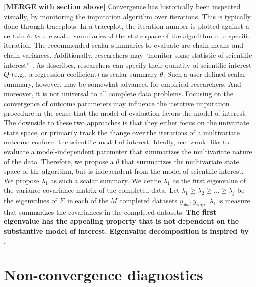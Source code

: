 \documentclass[Royal,times,sageh]{sagej}
\begin{document}
\textbf{{[}MERGE with section above{]}} Convergence has historically been inspected visually, by monitoring the imputation algorithm over iterations. This is typically done through traceplots. In a traceplot, the iteration number is plotted against a certain \(\theta\). \(\theta\)s are scalar summaries of the state space of the algorithm at a specific iteration. The recommended scalar summaries to evaluate are chain means and chain variances. Additionally, researchers may ``monitor some statistic of scientific interest'' \citep[\(\S\) 6.5.2]{buur18}. As \citet{buur18} describes, researchers can specify their quantity of scientific interest \(Q\) (e.g., a regression coefficient) as scalar summary \(\theta\). Such a user-defined scalar summary, however, may be somewhat advanced for empirical researchers. And moreover, it is not universal to all complete data problems. Focusing on the convergence of outcome parameters may influence the iterative imputation procedure in the sense that the model of evaluation favors the model of interest. The downside to these two approaches is that they either focus on the univariate state space, or primarily track the change over the iterations of a multivariate outcome conform the scientific model of interest. Ideally, one would like to evaluate a model-independent parameter that summarizes the multivariate nature of the data. Therefore, we propose a \(\theta\) that summarizes the multivariate state space of the algorithm, but is independent from the model of scientific interest. We propose \(\lambda_1\) as such a scalar summary. We define \(\lambda_1\) as the first eigenvalue of the variance-covariance matrix of the completed data. Let \(\lambda_1 \geq \lambda_2 \geq ... \geq \lambda_j\) be the eigenvalues of \(\Sigma\) in each of the \(M\) completed datasets \({y_{obs}, y_{imp}}\). \(\lambda_1\) is measure that summarizes the covariances in the completed datasets. \textbf{The first eigenvalue has the appealing property that is not dependent on the substantive model of interest. Eigenvalue decomposition is inspired by \citet{mack03}.}

\hypertarget{non-convergence-diagnostics}{%
\section{Non-convergence diagnostics}\label{non-convergence-diagnostics}}
\end{document}
